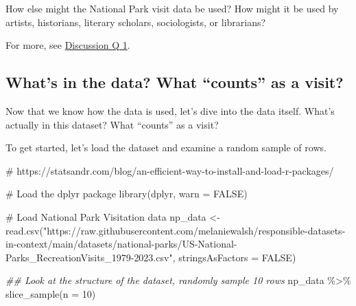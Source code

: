\documentclass[
  letterpaper,
  DIV=11,
  numbers=noendperiod]{scrartcl}
\newenvironment{Shaded}{\begin{snugshade}}{\end{snugshade}}
\newcommand{\AttributeTok}[1]{\textcolor[rgb]{0.40,0.45,0.13}{#1}}
\newcommand{\CommentTok}[1]{\textcolor[rgb]{0.37,0.37,0.37}{#1}}
\newcommand{\ConstantTok}[1]{\textcolor[rgb]{0.56,0.35,0.01}{#1}}
\newcommand{\DecValTok}[1]{\textcolor[rgb]{0.68,0.00,0.00}{#1}}
\newcommand{\DocumentationTok}[1]{\textcolor[rgb]{0.37,0.37,0.37}{\textit{#1}}}
\newcommand{\FunctionTok}[1]{\textcolor[rgb]{0.28,0.35,0.67}{#1}}
\newcommand{\NormalTok}[1]{\textcolor[rgb]{0.00,0.23,0.31}{#1}}
\newcommand{\OtherTok}[1]{\textcolor[rgb]{0.00,0.23,0.31}{#1}}
\newcommand{\SpecialCharTok}[1]{\textcolor[rgb]{0.37,0.37,0.37}{#1}}
\newcommand{\StringTok}[1]{\textcolor[rgb]{0.13,0.47,0.30}{#1}}
\begin{document}
\begin{tcolorbox}[enhanced jigsaw, title=\textcolor{quarto-callout-tip-color}{\faLightbulb}\hspace{0.5em}{Discussion Question 1}, opacityback=0, bottomtitle=1mm, left=2mm, coltitle=black, opacitybacktitle=0.6, breakable, arc=.35mm, colframe=quarto-callout-tip-color-frame, toprule=.15mm, rightrule=.15mm, colback=white, colbacktitle=quarto-callout-tip-color!10!white, leftrule=.75mm, toptitle=1mm, titlerule=0mm, bottomrule=.15mm]

How else might the National Park visit data be used? How might it be
used by artists, historians, literary scholars, sociologists, or
librarians?

For more, see
\href{?tab=discussion-\%26-activities\#discussion-1}{Discussion Q 1}.

\end{tcolorbox}

\subsection{What's in the data? What ``counts'' as a
visit?}\label{whats-in-the-data-what-counts-as-a-visit}

Now that we know how the data is used, let's dive into the data itself.
What's actually in this dataset? What ``counts'' as a visit?

To get started, let's load the dataset and examine a random sample of
rows.

\begin{Shaded}
\begin{Highlighting}[]
\CommentTok{\# https://statsandr.com/blog/an{-}efficient{-}way{-}to{-}install{-}and{-}load{-}r{-}packages/}

\CommentTok{\# Load the dplyr package}
\FunctionTok{library}\NormalTok{(dplyr, }\AttributeTok{warn =} \ConstantTok{FALSE}\NormalTok{)}

\CommentTok{\# Load National Park Visitation data}
\NormalTok{np\_data }\OtherTok{\textless{}{-}} \FunctionTok{read.csv}\NormalTok{(}\StringTok{"https://raw.githubusercontent.com/melaniewalsh/responsible{-}datasets{-}in{-}context/main/datasets/national{-}parks/US{-}National{-}Parks\_RecreationVisits\_1979{-}2023.csv"}\NormalTok{, }\AttributeTok{stringsAsFactors =} \ConstantTok{FALSE}\NormalTok{)}

\DocumentationTok{\#\# Look at the structure of the dataset, randomly sample 10 rows}
\NormalTok{np\_data }\SpecialCharTok{\%\textgreater{}\%} \FunctionTok{slice\_sample}\NormalTok{(}\AttributeTok{n =} \DecValTok{10}\NormalTok{)}
\end{Highlighting}
\end{Shaded}
\end{document}
